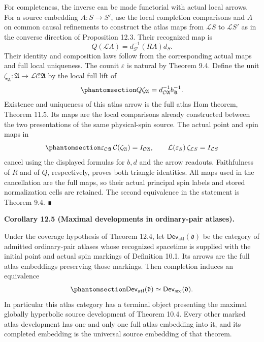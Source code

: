 \documentclass[
  english,
  11pt,
  reqno]{amsart}
\makeatletter
\newcommand{\pandocstatementheading}[1]{%
  \par\if@nobreak\else
    \addpenalty{\@beginparpenalty}%
    \addvspace{.5\baselineskip plus .2\baselineskip minus .2\baselineskip}%
  \fi
  {\normalfont\bfseries #1\par}%
  \nobreak\@afterindenttrue\@afterheading
}
\makeatother
\begin{document}
For completeness, the inverse can be made functorial with actual local
arrows. For a source embedding \(A:S\to S'\), use the local completion
comparisons and \(A\) on common causal refinements to construct the
atlas maps from \(\mathcal L S\) to \(\mathcal L S'\) as in the converse
direction of Proposition 12.3. Their recognized map is \[
Q(\mathcal L A)=d_{S'}^{-1}(RA)d_S.
\] Their identity and composition laws follow from the corresponding
actual maps and full local uniqueness. The counit \(\varepsilon\) is
natural by Theorem 9.4. Define the unit
\(\zeta_{\mathfrak A}:\mathfrak A\to\mathcal L\mathcal C\mathfrak A\) by
the local full lift of
\begin{equation}\protect\phantomsection\label{eq:ordinary-atlas-inverse-unit}{
Q\zeta_{\mathfrak A}
=d_{\mathcal C\mathfrak A}^{-1}b_{\mathfrak A}^{-1}.
}\end{equation} Existence and uniqueness of this atlas arrow is the full
atlas Hom theorem, Theorem 11.5. Its maps are the local comparisons
already constructed between the two presentations of the same
physical-spin source. The actual point and spin maps in
\begin{equation}\protect\phantomsection\label{eq:ordinary-atlas-inverse-triangles}{
\varepsilon_{\mathcal C\mathfrak A}\,
  \mathcal C(\zeta_{\mathfrak A})=I_{\mathcal C\mathfrak A},
\qquad
\mathcal L(\varepsilon_S)\,\zeta_{\mathcal L S}=I_{\mathcal L S}
}\end{equation} cancel using the displayed formulas for \(b,d\) and the
arrow readouts. Faithfulness of \(R\) and of \(Q\), respectively, proves
both triangle identities. All maps used in the cancellation are the full
maps, so their actual principal spin labels and stored normalization
cells are retained. The second equivalence in the statement is Theorem
9.4. ∎

\pandocstatementheading{\protect{}\label{cor:ordinary-atlas-maximal-development}Corollary 12.5 (Maximal developments in ordinary-pair atlases).}

Under the coverage hypothesis of Theorem 12.4, let
\(\mathsf{Dev}_{\mathrm{atl}}(\mathfrak d)\) be the category of admitted
ordinary-pair atlases whose recognized spacetime is supplied with the
initial point and actual spin markings of Definition 10.1. Its arrows
are the full atlas embeddings preserving those markings. Then completion
induces an equivalence
\begin{equation}\protect\phantomsection\label{eq:ordinary-atlas-marked-development-equivalence}{
\mathsf{Dev}_{\mathrm{atl}}(\mathfrak d)
\simeq
\mathsf{Dev}_{\mathrm{src}}(\mathfrak d).
}\end{equation} In particular this atlas category has a terminal object
presenting the maximal globally hyperbolic source development of Theorem
10.4. Every other marked atlas development has one and only one full
atlas embedding into it, and its completed embedding is the universal
source embedding of that theorem.
\end{document}
